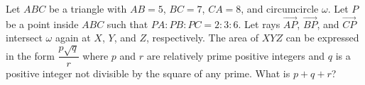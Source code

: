 Let $ABC$ be a triangle with $AB=5$, $BC=7$, $CA=8$, and circumcircle $\omega$. Let $P$ be a point inside $ABC$ such that $PA:PB:PC=2:3:6$. Let rays $\overrightarrow{AP}$, $\overrightarrow{BP}$, and $\overrightarrow{CP}$ intersect $\omega$ again at $X$, $Y$, and $Z$, respectively. The area of $XYZ$ can be expressed in the form $\dfrac{p\sqrt q}{r}$ where $p$ and $r$ are relatively prime positive integers and $q$ is a positive integer not divisible by the square of any prime. What is $p+q+r$?
